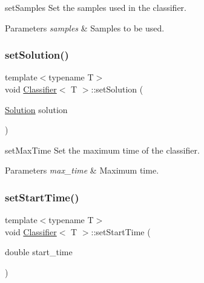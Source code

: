 set\+Samples Set the samples used in the classifier. 


\begin{DoxyParams}{Parameters}
{\em samples} & Samples to be used. \\
\hline
\end{DoxyParams}
\mbox{\label{class_classifier_a2eb8d760224eba3091c108155996d3d9}} 
\subsubsection{\texorpdfstring{set\+Solution()}{setSolution()}}
{\footnotesize\ttfamily template$<$typename T$>$ \\
void \hyperlink{class_classifier}{Classifier}$<$ T $>$\+::set\+Solution (\begin{DoxyParamCaption}\item[{\hyperlink{class_solution}{Solution}}]{solution }\end{DoxyParamCaption})\hspace{0.3cm}{\ttfamily [inline]}}



set\+Max\+Time Set the maximum time of the classifier. 


\begin{DoxyParams}{Parameters}
{\em max\+\_\+time} & Maximum time. \\
\hline
\end{DoxyParams}
\mbox{\label{class_classifier_a92fd489e75afe8b1bd2c88c478cf8f60}} 
\subsubsection{\texorpdfstring{set\+Start\+Time()}{setStartTime()}}
{\footnotesize\ttfamily template$<$typename T$>$ \\
void \hyperlink{class_classifier}{Classifier}$<$ T $>$\+::set\+Start\+Time (\begin{DoxyParamCaption}\item[{double}]{start\+\_\+time }\end{DoxyParamCaption})\hspace{0.3cm}{\ttfamily [inline]}}



